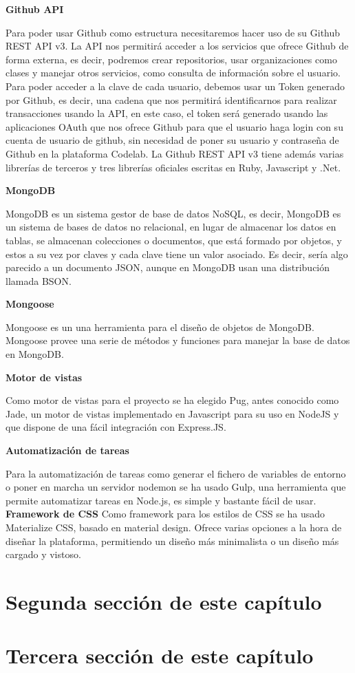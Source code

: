 {\bf Github API}

Para poder usar Github como estructura necesitaremos hacer uso de su Github REST API v3. 
La API nos permitirá acceder a los servicios que ofrece Github de forma externa, es decir, podremos crear repositorios, usar organizaciones como clases y manejar otros servicios, como consulta de información sobre el usuario.
Para poder acceder a la clave de cada usuario, debemos usar un Token generado por Github, es decir, una cadena que nos permitirá  identificarnos para realizar transacciones usando la API, en este caso, el token será generado usando las aplicaciones OAuth que nos ofrece Github para que el usuario haga login con su cuenta de usuario de github, sin necesidad de poner su usuario y contraseña de Github en la plataforma Codelab.
La Github REST API v3 tiene además varias librerías de terceros y tres librerías oficiales escritas en Ruby, Javascript y .Net.

{\bf MongoDB}

MongoDB es un sistema gestor de base de datos NoSQL, es decir, MongoDB es un sistema de bases de datos no relacional, en lugar de almacenar los datos en tablas, se almacenan colecciones o documentos, que está formado por objetos, y estos a su vez por claves y cada clave tiene un valor asociado. Es decir, sería algo parecido a un documento JSON, aunque en MongoDB usan una distribución llamada BSON.

{\bf Mongoose}

Mongoose es un una herramienta para el diseño de objetos de MongoDB. 
Mongoose provee una serie de métodos y funciones para manejar la base de datos en MongoDB.

{\bf Motor de vistas}

Como motor de vistas para el proyecto se ha elegido Pug, antes conocido como Jade, un motor de vistas implementado en Javascript para su uso en NodeJS y que dispone de una fácil integración con Express.JS. 

{\bf Automatización de tareas}

Para la automatización de tareas como generar el fichero de variables de entorno o poner en marcha un servidor nodemon se ha usado Gulp, una herramienta que permite automatizar tareas en Node.js, es simple y bastante fácil de usar.
{\bf Framework de CSS}
Como framework para los estilos de CSS se ha usado Materialize CSS, basado en material design. Ofrece varias opciones a la hora de diseñar la plataforma, permitiendo un diseño más minimalista o un diseño más cargado y vistoso.

\section{Segunda sección de este capítulo}
\label{3:sec2}

\section{Tercera sección de este capítulo}
\label{:sec3}
